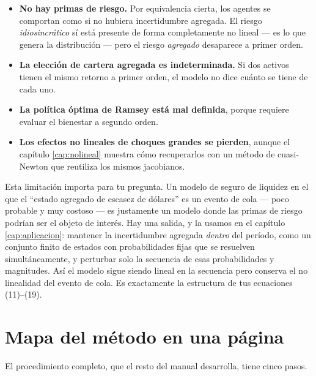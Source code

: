 \begin{itemize}[leftmargin=1.4em]
\item \textbf{No hay primas de riesgo.} Por equivalencia cierta, los agentes se
comportan como si no hubiera incertidumbre agregada. El riesgo
\emph{idiosincrático} sí está presente de forma completamente no lineal --- es
lo que genera la distribución --- pero el riesgo \emph{agregado} desaparece a
primer orden.
\item \textbf{La elección de cartera agregada es indeterminada.} Si dos activos
tienen el mismo retorno a primer orden, el modelo no dice cuánto se tiene de
cada uno.
\item \textbf{La política óptima de Ramsey está mal definida}, porque requiere
evaluar el bienestar a segundo orden.
\item \textbf{Los efectos no lineales de choques grandes se pierden}, aunque
el capítulo \ref{cap:nolineal} muestra cómo recuperarlos con un método de
cuasi-Newton que reutiliza los mismos jacobianos.
\end{itemize}

\begin{tutesis}
Esta limitación importa para tu pregunta. Un modelo de seguro de liquidez en el
que el ``estado agregado de escasez de dólares'' es un evento de cola --- poco
probable y muy costoso --- es justamente un modelo donde las primas de riesgo
podrían ser el objeto de interés. Hay una salida, y la usamos en el capítulo
\ref{cap:aplicacion}: mantener la incertidumbre agregada \emph{dentro} del
período, como un conjunto finito de estados con probabilidades fijas que se
resuelven simultáneamente, y perturbar solo la secuencia de esas probabilidades
y magnitudes. Así el modelo sigue siendo lineal en la secuencia pero conserva
el no linealidad del evento de cola. Es exactamente la estructura de tus
ecuaciones (11)--(19).
\end{tutesis}

\section{Mapa del método en una página}

El procedimiento completo, que el resto del manual desarrolla, tiene cinco pasos.

